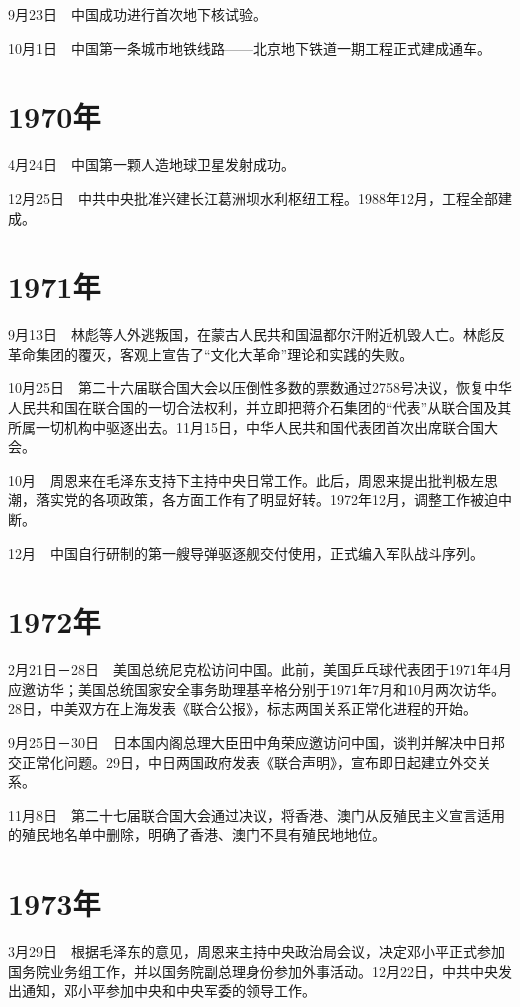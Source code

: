\documentclass[10pt,a4paper,twocolumn]{book}
\begin{document}
9月23日　中国成功进行首次地下核试验。

10月1日　中国第一条城市地铁线路——北京地下铁道一期工程正式建成通车。

\section{1970年}

4月24日　中国第一颗人造地球卫星发射成功。

12月25日　中共中央批准兴建长江葛洲坝水利枢纽工程。1988年12月，工程全部建成。

\section{1971年}

9月13日　林彪等人外逃叛国，在蒙古人民共和国温都尔汗附近机毁人亡。林彪反革命集团的覆灭，客观上宣告了“文化大革命”理论和实践的失败。

10月25日　第二十六届联合国大会以压倒性多数的票数通过2758号决议，恢复中华人民共和国在联合国的一切合法权利，并立即把蒋介石集团的“代表”从联合国及其所属一切机构中驱逐出去。11月15日，中华人民共和国代表团首次出席联合国大会。

10月　周恩来在毛泽东支持下主持中央日常工作。此后，周恩来提出批判极左思潮，落实党的各项政策，各方面工作有了明显好转。1972年12月，调整工作被迫中断。

12月　中国自行研制的第一艘导弹驱逐舰交付使用，正式编入军队战斗序列。

\section{1972年}

2月21日－28日　美国总统尼克松访问中国。此前，美国乒乓球代表团于1971年4月应邀访华；美国总统国家安全事务助理基辛格分别于1971年7月和10月两次访华。28日，中美双方在上海发表《联合公报》，标志两国关系正常化进程的开始。

9月25日－30日　日本国内阁总理大臣田中角荣应邀访问中国，谈判并解决中日邦交正常化问题。29日，中日两国政府发表《联合声明》，宣布即日起建立外交关系。

11月8日　第二十七届联合国大会通过决议，将香港、澳门从反殖民主义宣言适用的殖民地名单中删除，明确了香港、澳门不具有殖民地地位。

\section{1973年}

3月29日　根据毛泽东的意见，周恩来主持中央政治局会议，决定邓小平正式参加国务院业务组工作，并以国务院副总理身份参加外事活动。12月22日，中共中央发出通知，邓小平参加中央和中央军委的领导工作。
\end{document}
